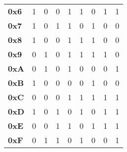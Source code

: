 \documentclass{article}
\begin{document}
\begin{table}[H]
\begin{tabular}{lcccccccc}
\multicolumn{1}{l|}{\textbf{0x6}} & \multicolumn{1}{c|}{1} & \multicolumn{1}{c|}{0} & \multicolumn{1}{c|}{0} & \multicolumn{1}{c|}{1} & \multicolumn{1}{c|}{1} & \multicolumn{1}{c|}{0} & \multicolumn{1}{c|}{1} & \multicolumn{1}{c|}{1} \\ \cline{2-9} 
\multicolumn{1}{l|}{\textbf{0x7}} & \multicolumn{1}{c|}{1} & \multicolumn{1}{c|}{0} & \multicolumn{1}{c|}{1} & \multicolumn{1}{c|}{1} & \multicolumn{1}{c|}{0} & \multicolumn{1}{c|}{1} & \multicolumn{1}{c|}{0} & \multicolumn{1}{c|}{0} \\ \cline{2-9} 
\multicolumn{1}{l|}{\textbf{0x8}} & \multicolumn{1}{c|}{1} & \multicolumn{1}{c|}{0} & \multicolumn{1}{c|}{0} & \multicolumn{1}{c|}{1} & \multicolumn{1}{c|}{1} & \multicolumn{1}{c|}{1} & \multicolumn{1}{c|}{0} & \multicolumn{1}{c|}{0} \\ \cline{2-9} 
\multicolumn{1}{l|}{\textbf{0x9}} & \multicolumn{1}{c|}{0} & \multicolumn{1}{c|}{1} & \multicolumn{1}{c|}{0} & \multicolumn{1}{c|}{1} & \multicolumn{1}{c|}{1} & \multicolumn{1}{c|}{1} & \multicolumn{1}{c|}{1} & \multicolumn{1}{c|}{0} \\ \cline{2-9} 
\multicolumn{1}{l|}{\textbf{0xA}} & \multicolumn{1}{c|}{0} & \multicolumn{1}{c|}{1} & \multicolumn{1}{c|}{0} & \multicolumn{1}{c|}{1} & \multicolumn{1}{c|}{0} & \multicolumn{1}{c|}{0} & \multicolumn{1}{c|}{0} & \multicolumn{1}{c|}{1} \\ \cline{2-9} 
\multicolumn{1}{l|}{\textbf{0xB}} & \multicolumn{1}{c|}{1} & \multicolumn{1}{c|}{0} & \multicolumn{1}{c|}{0} & \multicolumn{1}{c|}{0} & \multicolumn{1}{c|}{0} & \multicolumn{1}{c|}{1} & \multicolumn{1}{c|}{0} & \multicolumn{1}{c|}{0} \\ \cline{2-9} 
\multicolumn{1}{l|}{\textbf{0xC}} & \multicolumn{1}{c|}{0} & \multicolumn{1}{c|}{0} & \multicolumn{1}{c|}{0} & \multicolumn{1}{c|}{1} & \multicolumn{1}{c|}{1} & \multicolumn{1}{c|}{1} & \multicolumn{1}{c|}{1} & \multicolumn{1}{c|}{1} \\ \cline{2-9} 
\multicolumn{1}{l|}{\textbf{0xD}} & \multicolumn{1}{c|}{1} & \multicolumn{1}{c|}{0} & \multicolumn{1}{c|}{1} & \multicolumn{1}{c|}{0} & \multicolumn{1}{c|}{1} & \multicolumn{1}{c|}{0} & \multicolumn{1}{c|}{1} & \multicolumn{1}{c|}{1} \\ \cline{2-9} 
\multicolumn{1}{l|}{\textbf{0xE}} & \multicolumn{1}{c|}{0} & \multicolumn{1}{c|}{0} & \multicolumn{1}{c|}{1} & \multicolumn{1}{c|}{1} & \multicolumn{1}{c|}{0} & \multicolumn{1}{c|}{1} & \multicolumn{1}{c|}{1} & \multicolumn{1}{c|}{1} \\ \cline{2-9} 
\multicolumn{1}{l|}{\textbf{0xF}} & \multicolumn{1}{c|}{0} & \multicolumn{1}{c|}{1} & \multicolumn{1}{c|}{1} & \multicolumn{1}{c|}{0} & \multicolumn{1}{c|}{1} & \multicolumn{1}{c|}{0} & \multicolumn{1}{c|}{0} & \multicolumn{1}{c|}{1} \\ \cline{2-9} 
\end{tabular}
\end{table}
\end{document}
